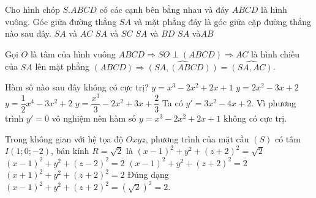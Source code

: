 		\begin{ex}%
			Cho hình chóp $S.ABCD$ có các cạnh bên bằng nhau và đáy $ABCD$ là hình vuông. Góc giữa đường thẳng $SA$ và mặt phẳng đáy là góc giữa cặp đường thẳng nào sau đây.
			\choice
			{\True $SA$ và $AC$}
			{$SA$ và $SC$}
			{$SA$ và $BD$}
			{$SA$ và$AB$}
			\loigiai
			{
				\begin{center}
				\end{center}
				Gọi $O$ là tâm của hình vuông $ABCD\Rightarrow SO\perp \left(ABCD\right)\Rightarrow AC$ là hình chiếu của $SA$ lên mặt phẳng $\left(ABCD\right)\Rightarrow \widehat{\left(SA,\left(ABCD\right)\right)}=\widehat{\left(SA,AC\right)}$.
			}
		\end{ex}
		
		\begin{ex}%
			Hàm số nào sau đây không có cực trị?
			\choice
			{\True $y=x^3-2x^2+2x+1$}
			{$y=2x^2-3x+2$}
			{$y=\dfrac{1}{2}x^4-3x^2+2$}
			{$y=\dfrac{x^3}{3}-2x^2+3x+\dfrac{2}{3}$}
			\loigiai
			{
				Ta có $y'=3x^2-4x+2$. Vì phương trình $y'=0$ vô nghiệm nên hàm số $y=x^3-2x^2+2x+1$ không có cực trị.
			}
		\end{ex}
			\begin{ex}%
			Trong không gian với hệ tọa độ $Oxyz$, phương trình của mặt cầu $(S)$ có tâm $I(1;0;-2)$, bán kính $R=\sqrt{2}$ là
			\choice
			{$(x-1)^2+y^2+(z+2)^2=\sqrt{2}$}
			{$(x-1)^2+y^2+(z-2)^2 = 2$}
			{\True $(x-1)^2 + y^2 + (z+2)^2 = 2$}
			{$(x+1)^2+y^2+(z+2)^2 = 2$}
			\loigiai
			{
				Đúng dạng $(x-1)^2 + y^2 + (z+2)^2 = \left(\sqrt{2}\right)^2 = 2$.
			}
		\end{ex}
		
